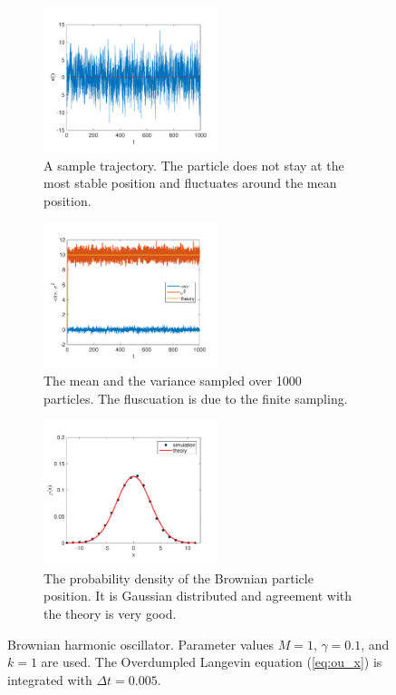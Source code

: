 \begin{figure}
	\centering
	\begin{subfigure}{0.32\textwidth}
		\centering
		\includegraphics[width=2in]{18.Langevin/Ornstein_Uhlenbeck_traject.pdf}
		\caption{A sample trajectory.  The particle does not stay at the most stable position and fluctuates around the mean position.}
		\label{fig:ou_x_traj}
	\end{subfigure}
	\begin{subfigure}{0.32\textwidth}
		\centering
		\includegraphics[width=2in]{18.Langevin/Ornstein_Uhlenbeck_stat1.pdf}
		\caption{The mean and the variance sampled over 1000 particles.  The fluscuation is due to the finite sampling.}
		\label{fig:ou_x_stat1}
	\end{subfigure}
	\begin{subfigure}{0.32\textwidth}
		\centering
		\includegraphics[width=2in]{18.Langevin/Ornstein_Uhlenbeck_stat2.pdf}
		\caption{The probability density of the Brownian particle position. It is Gaussian distributed and agreement with the theory is very good.}
		\label{fig:ou_x_stat2}
	\end{subfigure}
\caption{Brownian harmonic oscillator.  Parameter values $M=1$, $\gamma=0.1$, and $k=1$ are used. The Overdumpled Langevin equation (\ref{eq:ou_x}) is integrated with $\Delta t=0.005$.}\label{fig:brownian_harmo}
\end{figure}

